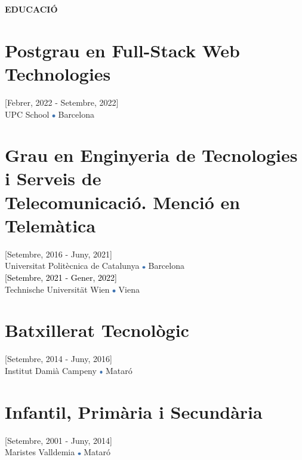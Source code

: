 \documentclass[../main.tex]{subfiles}
\begin{document}
    \vspace*{0.5cm}
    \textbf{\textcolor{myCV2}{EDUCACIÓ\underline{\hspace{7.95cm}}}}
        \vspace*{-0.3cm}
        
        \section*{Postgrau en Full-Stack Web Technologies}
        \vspace*{-0.4cm}
        [Febrer, 2022 - Setembre, 2022] \\
        UPC School
        \includegraphics[width=0.15cm]{assets/full.png} 
        Barcelona
        
        \vspace*{-0.25cm}
        \section*{Grau en Enginyeria de Tecnologies i Serveis de \\Telecomunicació. Menció en Telemàtica}
        \vspace*{-0.4cm}
        [Setembre, 2016 - Juny, 2021] \\
        Universitat Politècnica de Catalunya 
        \includegraphics[width=0.15cm]{assets/full.png} 
        Barcelona \\
        \textcolor{black}{[Setembre, 2021 - Gener, 2022]}\\
        Technische Universität Wien
        \includegraphics[width=0.15cm]{assets/full.png} 
        Viena
        
        \vspace*{-0.25cm}
        \section*{Batxillerat Tecnològic}
        \vspace*{-0.4cm}
        [Setembre, 2014 - Juny, 2016] \\
        Institut Damià Campeny
        \includegraphics[width=0.15cm]{assets/full.png} 
        Mataró

        \vspace*{-0.25cm}
        \section*{Infantil, Primària i Secundària}
        \vspace*{-0.4cm}
        [Setembre, 2001 - Juny, 2014]\\
        Maristes Valldemia
        \includegraphics[width=0.15cm]{assets/full.png} 
        Mataró
\end{document}
